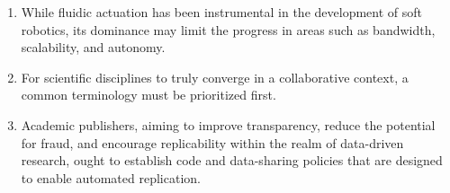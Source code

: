 \documentclass[a5paper]{article}
\begin{document}
\begin{enumerate}
  \item While fluidic actuation has been instrumental in the development of soft robotics, its dominance may limit the progress in areas such as bandwidth, scalability, and autonomy.

  \item For scientific disciplines to truly converge in a collaborative context, a common terminology must be prioritized first.

  \item Academic publishers, aiming to improve transparency, reduce the potential for fraud, and encourage replicability within the realm of data-driven research, ought to establish code and data-sharing policies that are designed to enable automated replication.


\end{enumerate}
\end{document}
